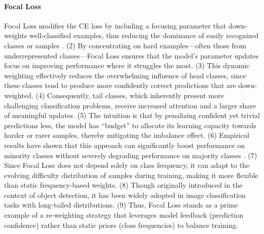 \paragraph{Focal Loss}
Focal Loss modifies the CE loss by including a focusing parameter that down-weights well-classified examples, thus reducing the dominance of easily recognized classes or samples \cite{lin2018focallossdenseobject}.
(2) By concentrating on hard examples—often those from underrepresented classes—Focal Loss ensures that the model’s parameter updates focus on improving performance where it struggles the most.
(3) This dynamic weighting effectively reduces the overwhelming influence of head classes, since these classes tend to produce more confidently correct predictions that are down-weighted.
(4) Consequently, tail classes, which inherently present more challenging classification problems, receive increased attention and a larger share of meaningful updates.
(5) The intuition is that by penalizing confident yet trivial predictions less, the model has “budget” to allocate its learning capacity towards harder or rarer samples, thereby mitigating the imbalance effect.
(6) Empirical results have shown that this approach can significantly boost performance on minority classes without severely degrading performance on majority classes \cite{zhang2023deep}.
(7) Since Focal Loss does not depend solely on class frequency, it can adapt to the evolving difficulty distribution of samples during training, making it more flexible than static frequency-based weights.
(8) Though originally introduced in the context of object detection, it has been widely adopted in image classification tasks with long-tailed distributions.
(9) Thus, Focal Loss stands as a prime example of a re-weighting strategy that leverages model feedback (prediction confidence) rather than static priors (class frequencies) to balance training.

